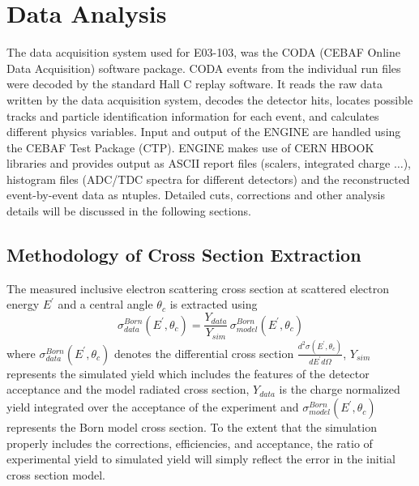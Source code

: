 \section{Data Analysis}\label{anal.sec}

The data acquisition system used for E03-103, was the CODA (CEBAF Online Data
Acquisition) software package. CODA events from the individual run files were
decoded by the standard Hall C replay software. It reads the raw data written
by the data acquisition system, decodes the detector hits, locates possible
tracks and particle identification information for each event, and calculates
different physics variables. Input and output of the ENGINE are handled using
the CEBAF Test Package (CTP). ENGINE makes use of CERN HBOOK libraries and
provides output as ASCII report files (scalers, integrated charge $\ldots$),
histogram files (ADC/TDC spectra for different detectors) and the
reconstructed event-by-event data as ntuples. Detailed cuts, corrections and
other analysis details will be discussed in the following sections.



\subsection{Methodology of Cross Section Extraction}\label{proc.ssec}

The measured inclusive electron scattering cross section at scattered electron
energy $E^{\prime}$ and a central angle $\theta_{c}$ is extracted using
%
\begin{equation}\label{csmaster1.eq}
 \sigma^{Born}_{data}(E^{\prime},\theta_{c}) = \frac{Y_{data}}{Y_{sim}}\, \sigma^{Born}_{model}(E^{\prime},\theta_{c})
\end{equation}
%
where $\sigma^{Born}_{data}(E^{\prime},\theta_{c}) $ denotes the differential
cross section $\frac{d^2\sigma(E^{\prime},\theta_{c})}{dE^{\prime}d\Omega}$,
$Y_{sim}$ represents the simulated yield which includes the features of the
detector acceptance and the model radiated cross section, $Y_{data}$ is the
charge normalized yield integrated over the acceptance of the experiment and
$\sigma^{Born}_{model}(E^{\prime},\theta_{c})$ represents the Born model cross
section.  To the extent that the simulation properly includes the corrections,
efficiencies, and acceptance, the ratio of experimental yield to simulated yield
will simply reflect the error in the initial cross section model.

